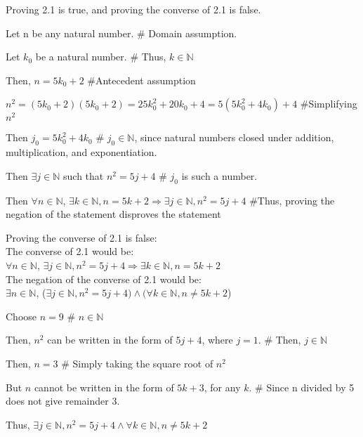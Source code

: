 \documentclass{article}
\begin{document}
\begin{enumerate}
\item Proving 2.1 is true, and proving the converse of 2.1 is false.
				\item Then $\forall n \in \mathbb{N}$, $\exists k \in \mathbb{N}, n = 5k+2 \Rightarrow \exists j \in \mathbb{N}, n^2 = 5j+4$ \#Thus, proving the negation of the statement disproves the statement
		\end {description}

Proving the converse of 2.1 is false:\\
The converse of 2.1 would be:\\
$\forall n \in \mathbb{N}$, $\exists j \in \mathbb{N}, n^2 = 5j+4 \Rightarrow \exists k \in \mathbb{N}, n = 5k+2$\\
The negation of the converse of 2.1 would be:\\
$\exists n \in \mathbb{N}$, ($\exists j \in \mathbb{N}, n^2 = 5j+4) \wedge (\forall k \in \mathbb{N}, n \neq 5k+2$)
		\begin {description}
				\item Choose $n = 9$ \# $n \in \mathbb{N}$
				\item Then, $n^2$ can be written in the form of $5j + 4$, where $j = 1$. \# Then, $j \in \mathbb{N}$
				\item Then, $n = 3$ \# Simply taking the square root of $n^2$
				\item But $n$ cannot be written in the form of $5k + 3$, for any $k$. \# Since n divided by 5 does not give remainder 3.
				\item Thus, $\exists j \in \mathbb{N}, n^2 = 5j+4 \wedge\forall k \in \mathbb{N}, n \neq 5k+2$ 
		

\end{description}
\end{enumerate}
\end{document}
